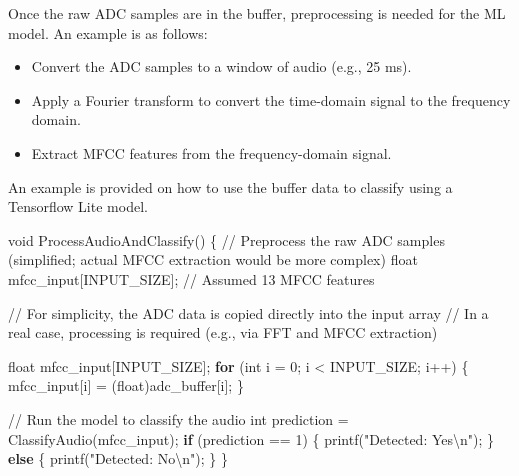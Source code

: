 \documentclass[
  9pt,
  letterpaper,
  abstract,
  titlepage]{scrbook}
\newenvironment{Shaded}{\begin{snugshade}}{\end{snugshade}}
\newcommand{\CommentTok}[1]{\textcolor[rgb]{0.37,0.37,0.37}{#1}}
\newcommand{\ControlFlowTok}[1]{\textcolor[rgb]{0.00,0.23,0.31}{\textbf{#1}}}
\newcommand{\DataTypeTok}[1]{\textcolor[rgb]{0.68,0.00,0.00}{#1}}
\newcommand{\DecValTok}[1]{\textcolor[rgb]{0.68,0.00,0.00}{#1}}
\newcommand{\NormalTok}[1]{\textcolor[rgb]{0.00,0.23,0.31}{#1}}
\newcommand{\OperatorTok}[1]{\textcolor[rgb]{0.37,0.37,0.37}{#1}}
\newcommand{\SpecialCharTok}[1]{\textcolor[rgb]{0.37,0.37,0.37}{#1}}
\newcommand{\StringTok}[1]{\textcolor[rgb]{0.13,0.47,0.30}{#1}}
\begin{document}
Once the raw ADC samples are in the buffer, preprocessing is needed for
the ML model. An example is as follows:

\begin{itemize}
\item
  Convert the ADC samples to a window of audio (e.g., 25 ms).
\item
  Apply a Fourier transform to convert the time-domain signal to the
  frequency domain.
\item
  Extract MFCC features from the frequency-domain signal.
\end{itemize}

An example is provided on how to use the buffer data to classify using a
Tensorflow Lite model.

\begin{Shaded}
\begin{Highlighting}[]
\DataTypeTok{void}\NormalTok{ ProcessAudioAndClassify}\OperatorTok{()} \OperatorTok{\{}
    \CommentTok{// Preprocess the raw ADC samples (simplified; actual MFCC extraction would be more complex)}
    \DataTypeTok{float}\NormalTok{ mfcc\_input}\OperatorTok{[}\NormalTok{INPUT\_SIZE}\OperatorTok{];}  \CommentTok{// Assumed 13 MFCC features}
    
    \CommentTok{// For simplicity, the ADC data is copied directly into the input array}
    \CommentTok{// In a real case, processing is required (e.g., via FFT and MFCC extraction)}

    \DataTypeTok{float}\NormalTok{ mfcc\_input}\OperatorTok{[}\NormalTok{INPUT\_SIZE}\OperatorTok{];}
    \ControlFlowTok{for} \OperatorTok{(}\DataTypeTok{int}\NormalTok{ i }\OperatorTok{=} \DecValTok{0}\OperatorTok{;}\NormalTok{ i }\OperatorTok{\textless{}}\NormalTok{ INPUT\_SIZE}\OperatorTok{;}\NormalTok{ i}\OperatorTok{++)} \OperatorTok{\{}
\NormalTok{        mfcc\_input}\OperatorTok{[}\NormalTok{i}\OperatorTok{]} \OperatorTok{=} \OperatorTok{(}\DataTypeTok{float}\OperatorTok{)}\NormalTok{adc\_buffer}\OperatorTok{[}\NormalTok{i}\OperatorTok{];}
    \OperatorTok{\}}

    \CommentTok{// Run the model to classify the audio}
    \DataTypeTok{int}\NormalTok{ prediction }\OperatorTok{=}\NormalTok{ ClassifyAudio}\OperatorTok{(}\NormalTok{mfcc\_input}\OperatorTok{);}
    \ControlFlowTok{if} \OperatorTok{(}\NormalTok{prediction }\OperatorTok{==} \DecValTok{1}\OperatorTok{)} \OperatorTok{\{}
\NormalTok{        printf}\OperatorTok{(}\StringTok{"Detected: Yes}\SpecialCharTok{\textbackslash{}n}\StringTok{"}\OperatorTok{);}
    \OperatorTok{\}} \ControlFlowTok{else} \OperatorTok{\{}
\NormalTok{        printf}\OperatorTok{(}\StringTok{"Detected: No}\SpecialCharTok{\textbackslash{}n}\StringTok{"}\OperatorTok{);}
    \OperatorTok{\}}
\OperatorTok{\}}
\end{Highlighting}
\end{Shaded}
\end{document}
